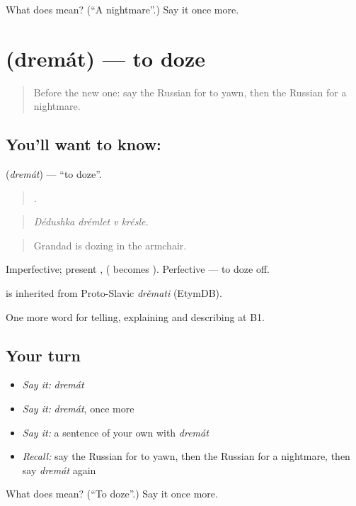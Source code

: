 \begin{tcolorbox}[breakable,colback=teal!4,colframe=teal!35!black,title={Before you move on}]
What does  mean? (\textquotedblleft{}A nightmare\textquotedblright{}.) Say it once more.
\end{tcolorbox}
\section[\texorpdfstring{\ru{дремать} (dremát)}{дремать (dremát)}]{ (dremát) — to doze}

\label{lesson:RU-C488-dremat}



\begin{quote}
Before the new one: say the Russian for to yawn, then the Russian for a nightmare.
\end{quote}

\subsection*{You'll want to know: }
\textbf{} (\emph{dremát}) — \textquotedblleft{}to doze\textquotedblright{}.

\begin{quote}
   .
\end{quote}

\begin{quote}
\emph{Dédushka drémlet v krésle.}
\end{quote}

\begin{quote}
Grandad is dozing in the armchair.
\end{quote}

Imperfective; present ,  ( becomes ). Perfective  — to doze off.

\begin{cousinweb}
\emph{} is inherited from Proto-Slavic \emph{drěmati} (EtymDB).
\end{cousinweb}

\begin{grammarlens}[title={What you've built}]
One more word for telling, explaining and describing at B1.
\end{grammarlens}

\subsection*{Your turn}
\begin{itemize}
\raggedright
  \item \emph{Say it:} \emph{dremát}
  \item \emph{Say it:} \emph{dremát}, once more
  \item \emph{Say it:} a sentence of your own with \emph{dremát}
  \item \emph{Recall:} say the Russian for to yawn, then the Russian for a nightmare, then say \emph{dremát} again
\end{itemize}

\begin{tcolorbox}[breakable,colback=teal!4,colframe=teal!35!black,title={Before you move on}]
What does  mean? (\textquotedblleft{}To doze\textquotedblright{}.) Say it once more.
\end{tcolorbox}
